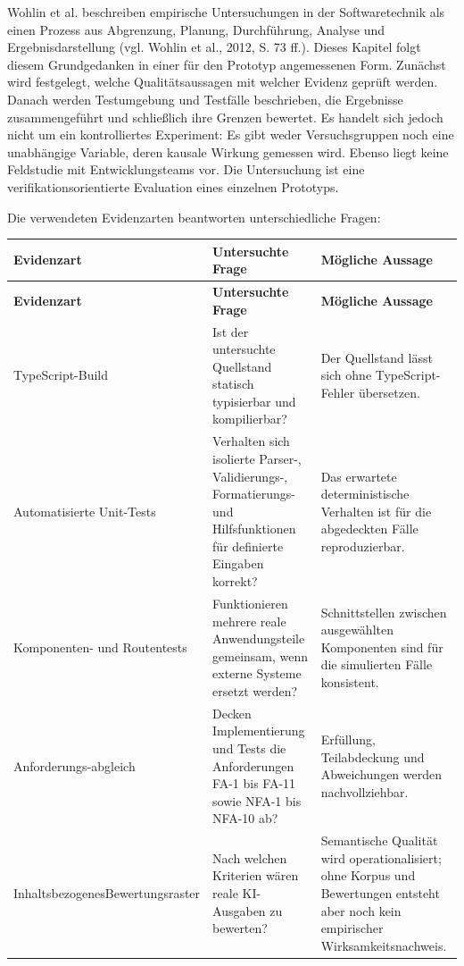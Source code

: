 Wohlin et al. beschreiben empirische Untersuchungen in der Softwaretechnik als einen Prozess aus Abgrenzung, Planung, Durchführung, Analyse und Ergebnisdarstellung (vgl. Wohlin et al., 2012, S. 73 ff.). Dieses Kapitel folgt diesem Grundgedanken in einer für den Prototyp angemessenen Form. Zunächst wird festgelegt, welche Qualitätsaussagen mit welcher Evidenz geprüft werden. Danach werden Testumgebung und Testfälle beschrieben, die Ergebnisse zusammengeführt und schließlich ihre Grenzen bewertet. Es handelt sich jedoch nicht um ein kontrolliertes Experiment: Es gibt weder Versuchsgruppen noch eine unabhängige Variable, deren kausale Wirkung gemessen wird. Ebenso liegt keine Feldstudie mit Entwicklungsteams vor. Die Untersuchung ist eine verifikationsorientierte Evaluation eines einzelnen Prototyps.

Die verwendeten Evidenzarten beantworten unterschiedliche Fragen:

\begin{longtable}{@{}>{\raggedright\arraybackslash}p{}>{\raggedright\arraybackslash}p{}>{\raggedright\arraybackslash}p{}@{}}
\toprule
\textbf{Evidenzart} & \textbf{Untersuchte Frage} & \textbf{Mögliche Aussage} \\
\midrule
\endfirsthead
\toprule
\textbf{Evidenzart} & \textbf{Untersuchte Frage} & \textbf{Mögliche Aussage} \\
\midrule
\endhead
TypeScript-Build & Ist der untersuchte Quellstand statisch typisierbar und kompilierbar? & Der Quellstand lässt sich ohne TypeScript-Fehler übersetzen. \\
Automatisierte Unit-Tests & Verhalten sich isolierte Parser-, Validierungs-, Formatierungs- und Hilfsfunktionen für definierte Eingaben korrekt? & Das erwartete deterministische Verhalten ist für die abgedeckten Fälle reproduzierbar. \\
Komponenten- und Routentests & Funktionieren mehrere reale Anwendungsteile gemeinsam, wenn externe Systeme ersetzt werden? & Schnittstellen zwischen ausgewählten Komponenten sind für die simulierten Fälle konsistent. \\
Anforderungs-\newline abgleich & Decken Implementierung und Tests die Anforderungen FA-1 bis FA-11 sowie NFA-1 bis NFA-10 ab? & Erfüllung, Teilabdeckung und Abweichungen werden nachvollziehbar. \\
Inhaltsbezogenes\newline Bewertungsraster & Nach welchen Kriterien wären reale KI-Ausgaben zu bewerten? & Semantische Qualität wird operationalisiert; ohne Korpus und Bewertungen entsteht aber noch kein empirischer Wirksamkeitsnachweis. \\
\bottomrule
\end{longtable}

